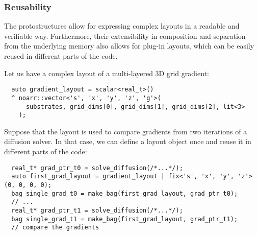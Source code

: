 \subsubsection{Reusability}

The protostructures allow for expressing complex layouts in a readable and verifiable way. Furthermore, their extensibility in composition and separation from the underlying memory also allows for plug-in layouts, which can be easily reused in different parts of the code.

Let us have a complex layout of a multi-layered 3D grid gradient:
\begin{verbatim}
  auto gradient_layout = scalar<real_t>() 
  ^ noarr::vector<'s', 'x', 'y', 'z', 'g'>(
      substrates, grid_dims[0], grid_dims[1], grid_dims[2], lit<3>
    );
\end{verbatim}
Suppose that the layout is used to compare gradients from two iterations of a diffusion solver. In that case, we can define a layout object once and reuse it in different parts of the code:
\begin{verbatim}
  real_t* grad_ptr_t0 = solve_diffusion(/*...*/);
  auto first_grad_layout = gradient_layout | fix<'s', 'x', 'y', 'z'>(0, 0, 0, 0);
  bag single_grad_t0 = make_bag(first_grad_layout, grad_ptr_t0);
  // ...
  real_t* grad_ptr_t1 = solve_diffusion(/*...*/);
  bag single_grad_t1 = make_bag(first_grad_layout, grad_ptr_t1);
  // compare the gradients
  
\end{verbatim}




